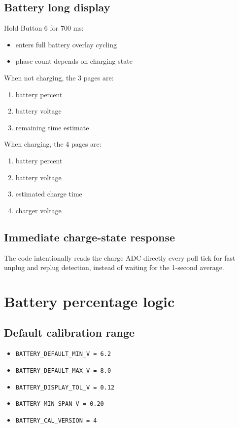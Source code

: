 \documentclass[11pt]{article}
\begin{document}
\subsection{Battery long display}
Hold Button 6 for 700 ms:
\begin{itemize}
  \item enters full battery overlay cycling
  \item phase count depends on charging state
\end{itemize}

When not charging, the 3 pages are:
\begin{enumerate}
  \item battery percent
  \item battery voltage
  \item remaining time estimate
\end{enumerate}

When charging, the 4 pages are:
\begin{enumerate}
  \item battery percent
  \item battery voltage
  \item estimated charge time
  \item charger voltage
\end{enumerate}

\subsection{Immediate charge-state response}
The code intentionally reads the charge ADC directly every poll tick for fast unplug and replug detection, instead of waiting for the 1-second average.

\section{Battery percentage logic}
\subsection{Default calibration range}
\begin{itemize}
  \item \texttt{BATTERY\_DEFAULT\_MIN\_V = 6.2}
  \item \texttt{BATTERY\_DEFAULT\_MAX\_V = 8.0}
  \item \texttt{BATTERY\_DISPLAY\_TOL\_V = 0.12}
  \item \texttt{BATTERY\_MIN\_SPAN\_V = 0.20}
  \item \texttt{BATTERY\_CAL\_VERSION = 4}
\end{itemize}
\end{document}
